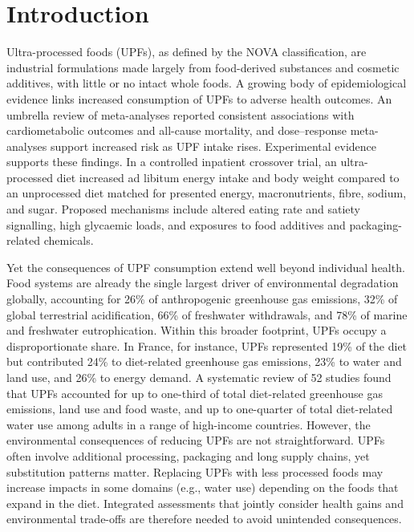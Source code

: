 ﻿\documentclass{article}
\begin{document}
\thispagestyle{empty}
\clearpage
\bigskip
\thispagestyle{empty}
\clearpage
\setcounter{page}{1}

\section{Introduction}

Ultra-processed foods (UPFs), as defined by the NOVA classification, are industrial formulations made largely from food-derived substances and cosmetic additives, with little or no intact whole foods.\cite{Monteiro2019UPFIdentify,Monteiro2019FAO} A growing body of epidemiological evidence links increased consumption of UPFs to adverse health outcomes. An umbrella review of meta-analyses reported consistent associations with cardiometabolic outcomes and all-cause mortality,\cite{Lane2024BMJ} and dose--response meta-analyses support increased risk as UPF intake rises.\cite{Qu2024} Experimental evidence supports these findings. In a controlled inpatient crossover trial, an ultra-processed diet increased ad libitum energy intake and body weight compared to an unprocessed diet matched for presented energy, macronutrients, fibre, sodium, and sugar.\cite{Hall2019} Proposed mechanisms include altered eating rate and satiety signalling, high glycaemic loads, and exposures to food additives and packaging-related chemicals.\cite{Monteiro2019FAO,Lane2024BMJ,Yates2024}

Yet the consequences of UPF consumption extend well beyond individual health. Food systems are already the single largest driver of environmental degradation globally, accounting for 26\% of anthropogenic greenhouse gas emissions, 32\% of global terrestrial acidification, 66\% of freshwater withdrawals, and 78\% of marine and freshwater eutrophication.\cite{Poore2018,Crippa2021NatureFood} Within this broader footprint, UPFs occupy a disproportionate share. In France, for instance, UPFs represented 19\% of the diet but contributed 24\% to diet-related greenhouse gas emissions, 23\% to water and land use, and 26\% to energy demand.\cite{KesseGuyot2023} A systematic review of 52 studies found that UPFs accounted for up to one-third of total diet-related greenhouse gas emissions, land use and food waste, and up to one-quarter of total diet-related water use among adults in a range of high-income countries.\cite{Anastasiou2022} However, the environmental consequences of reducing UPFs are not straightforward. UPFs often involve additional processing, packaging and long supply chains,\citep{Seferidi2020} yet substitution patterns matter. Replacing UPFs with less processed foods may increase impacts in some domains (e.g., water use) depending on the foods that expand in the diet.\citep{Anastasiou2022JCP,Garzillo2022RSP,Arrieta2022SustainSci} Integrated assessments that jointly consider health gains and environmental trade-offs are therefore needed to avoid unintended consequences.
\end{document}

